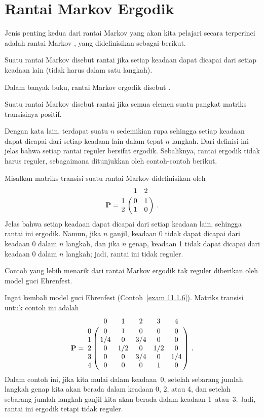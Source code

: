 \section{Rantai Markov Ergodik}\label{sec 11.3}
 
Jenis penting kedua dari rantai Markov yang akan kita pelajari secara terperinci
adalah rantai Markov , yang didefinisikan sebagai berikut.

\begin{definition}\label{defn 11.3.6.5}
Suatu rantai Markov disebut rantai  jika setiap keadaan dapat
dicapai dari setiap keadaan lain (tidak harus dalam satu langkah).
\end{definition}
\par
Dalam banyak buku, rantai Markov ergodik disebut .

\begin{definition}\label{defn 11.3.7}
Suatu rantai Markov disebut rantai  jika semua elemen suatu
pangkat matriks transisinya positif.
\end{definition}
\par
Dengan kata lain, terdapat suatu $n$ sedemikian rupa sehingga setiap keadaan
dapat dicapai dari setiap keadaan lain dalam tepat $n$ langkah. Dari definisi ini
jelas bahwa setiap rantai reguler bersifat ergodik. Sebaliknya, rantai ergodik
tidak harus reguler, sebagaimana ditunjukkan oleh contoh-contoh berikut.

\begin{example}
Misalkan matriks transisi suatu rantai Markov didefinisikan oleh
$$\mat{P} = \bordermatrix{
   &  1  &  2  \cr
1  &  0  &  1  \cr
2  &  1  &  0}\ .
$$
Jelas bahwa setiap keadaan dapat dicapai dari setiap keadaan lain, sehingga
rantai ini ergodik. Namun, jika $n$ ganjil, keadaan 0 tidak dapat dicapai dari
keadaan 0 dalam $n$ langkah, dan jika $n$ genap, keadaan 1 tidak dapat dicapai
dari keadaan 0 dalam $n$ langkah; jadi, rantai ini tidak reguler.
\end{example}
Contoh yang lebih menarik dari rantai Markov ergodik tak reguler diberikan oleh
model guci Ehrenfest.

\begin{example}
Ingat kembali model guci Ehrenfest (Contoh~\ref{exam 11.1.6}).
 Matriks transisi untuk contoh ini adalah
$$
\mat{P} = \bordermatrix{
  &  0  &  1  &  2  &  3  &  4  \cr
0 &  0  &  1  &  0  &  0  &  0  \cr
1 & 1/4 &  0  & 3/4 &  0  &  0  \cr
2 &  0  & 1/2 &  0  & 1/2 &  0  \cr
3 &  0  &  0  & 3/4 &  0  & 1/4 \cr
4 &  0  &  0  &  0  &  1  &  0}\ .
$$
Dalam contoh ini, jika kita mulai dalam keadaan~0, setelah sebarang jumlah
langkah genap kita akan berada dalam keadaan 0, 2, atau 4, dan setelah sebarang
jumlah langkah ganjil kita akan berada dalam keadaan 1~atau~3. Jadi, rantai ini
ergodik tetapi tidak reguler.
\end{example}

